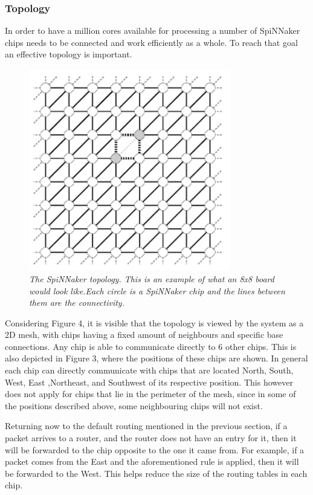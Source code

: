 \documentclass[12pt,a4paper]{article}
\begin{document}
\subsubsection{Topology}
In order to have a million cores available for processing a number of SpiNNaker chips needs to be connected and work efficiently as a whole. To reach that goal an effective topology is important.
\begin{figure}[h!]
\includegraphics[width=250pt,height=250pt,scale=2]{Pics/topology.png}
\centering
\caption{
\emph{The SpiNNaker topology\cite{navaridas2009understanding}. This is an example of what an 8x8 board would look like.Each circle is a SpiNNaker chip and the lines between them are the connectivity.}}
\end{figure}

Considering Figure 4, it is visible that the topology is viewed by the system as a 2D mesh, with chips having a fixed amount of neighbours and specific base connections. Any chip is able to communicate directly to 6 other chips. This is also depicted in Figure 3, where the positions of these chips are shown. In general each chip can directly communicate with chips that are located North, South, West, East ,Northeast, and Southwest of its respective position. This however does not apply for chips that lie in the perimeter of the mesh, since in some of the positions described above, some neighbouring chips will not exist\cite{furber2012overview}. 

Returning now to the default routing mentioned in the previous section, if a packet arrives to a router, and the router does not have an entry for it, then it will be forwarded to the chip opposite to the one it came from. For example, if a packet comes from the East and the aforementioned rule is applied, then it will be forwarded to the West. This helps reduce the size of the routing tables in each chip\cite{khan2008spinnaker}.
\end{document}
